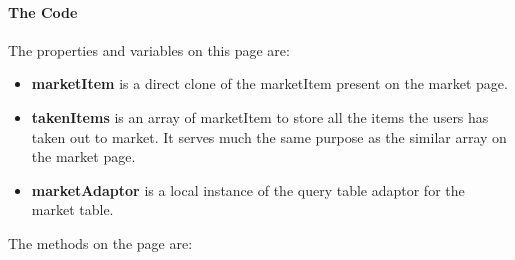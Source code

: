 ﻿\documentclass{article}
\begin{document}
    \paragraph{The Code}
    The properties and variables on this page are:
    \begin{itemize}
        \item \textbf{marketItem} is a direct clone of the marketItem present on the market page.
        \item \textbf{takenItems} is an array of marketItem to store all the items the users has taken out to market.
        It serves much the same purpose as the similar array on the market page.
        \item \textbf{marketAdaptor} is a local instance of the query table adaptor for the market table.
    \end{itemize}
    The methods on the page are:
\end{document}
